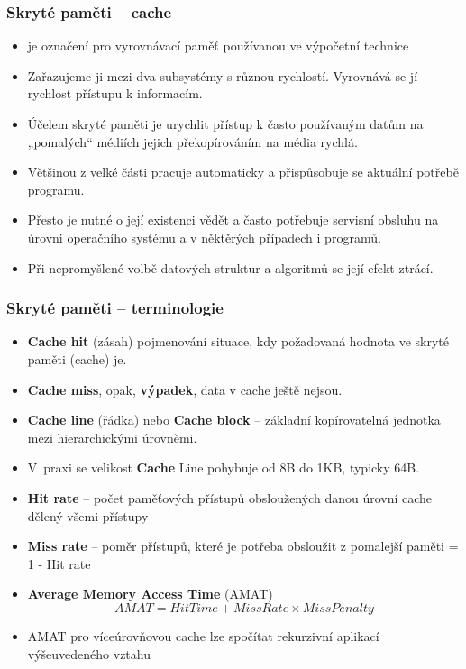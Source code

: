 \begin{frame}
\frametitle{Skryté paměti -- cache}

\begin{itemize}
\item je označení pro vyrovnávací paměť používanou ve výpočetní technice
\item Zařazujeme ji mezi dva subsystémy s různou rychlostí. Vyrovnává se jí rychlost přístupu k informacím.
\item Účelem skryté paměti je urychlit přístup k často používaným datům na „pomalých“ médiích jejich překopírováním na média rychlá.
\item Většinou z velké části pracuje automaticky a přispůsobuje se aktuální potřebě programu.
\item Přesto je nutné o její existenci vědět a často potřebuje servisní obsluhu na úrovni operačního systému a v něktěrých případech i programů.
\item Při nepromyšlené volbě datových struktur a algoritmů se její efekt ztrácí.
\end{itemize}

\end{frame}

\begin{frame}
\frametitle{Skryté paměti -- terminologie}

\begin{itemize}
\item \textbf{Cache hit} (zásah) pojmenování situace, kdy požadovaná hodnota ve skryté paměti (cache) je.
\item \textbf{Cache miss}, opak, \textbf{výpadek}, data v cache ještě nejsou.
\item \textbf{Cache line} (řádka) nebo \textbf{Cache block} – základní kopírovatelná jednotka mezi hierarchickými úrovněmi. 
\item V praxi se velikost \textbf{Cache} Line pohybuje od 8B do 1KB, typicky 64B.
\item \textbf{Hit rate} -- počet paměťových přístupů obsloužených danou úrovní cache dělený všemi přístupy
\item \textbf{Miss rate} -- poměr přístupů, které je potřeba obsloužit z pomalejší paměti = 1 - Hit rate
\item \textbf{Average Memory Access Time} (AMAT) $$AMAT = Hit Time + Miss Rate \times Miss Penalty$$
\item AMAT pro víceúrovňovou cache lze spočítat rekurzivní aplikací výšeuvedeného vztahu
\end{itemize}

\end{frame}

